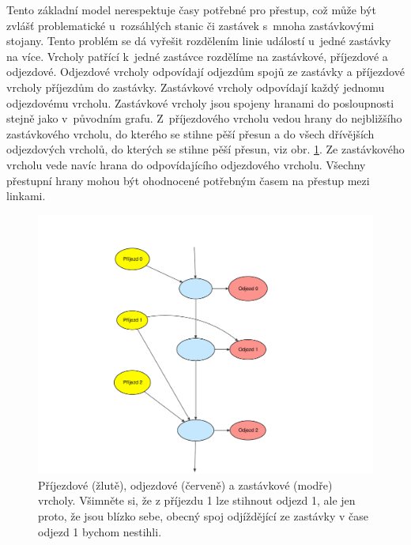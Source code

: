 Tento základní model nerespektuje časy potřebné pro přestup, což může být
zvlášť problematické u~rozsáhlých stanic či zastávek s~mnoha zastávkovými
stojany. Tento problém se dá vyřešit rozdělením linie událostí u~jedné zastávky
na více. Vrcholy patřící k~jedné zastávce rozdělíme na zastávkové, příjezdové a
odjezdové. Odjezdové vrcholy odpovídají odjezdům spojů ze zastávky a příjezdové
vrcholy příjezdům do zastávky. Zastávkové vrcholy odpovídají každý jednomu
odjezdovému vrcholu. Zastávkové vrcholy jsou spojeny hranami do posloupnosti
stejně jako v~původním grafu. Z~příjezdového vrcholu vedou hrany do nejbližšího
zastávkového vrcholu, do kterého se stihne pěší přesun a do všech dřívějších
odjezdových vrcholů, do kterých se stihne pěší přesun, viz obr.
\ref{fig:time-expanded}. Ze zastávkového vrcholu
vede navíc hrana do odpovídajícího odjezdového vrcholu. Všechny přestupní hrany
mohou být ohodnocené potřebným časem na přestup mezi linkami. 
\begin{figure}[h]
  \centering
    \includegraphics[width=\textwidth]{../img/time-expanded.pdf}
  \caption{Příjezdové (žlutě), odjezdové (červeně) a zastávkové (modře) vrcholy.
  Všimněte si, že z příjezdu 1 lze stihnout odjezd 1, ale jen proto, že jsou
  blízko sebe, obecný spoj odjíždějící ze zastávky v čase odjezd 1 bychom
  nestihli.}
  \label{fig:time-expanded}
\end{figure}

